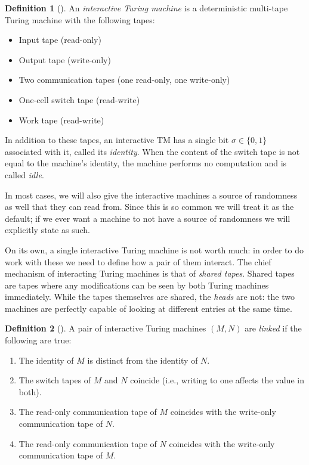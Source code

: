 \documentclass[english,12pt]{reedthesis}
\theoremstyle{plain}
\theoremstyle{definition}
\newtheorem{defn}[defn]{Definition}
\theoremstyle{remark}
\begin{document}
\begin{defn}[{\cite[Def.\ 4.2.1]{Go01}}]\label{def:interactive-tm}
  An \emph{interactive Turing machine} is a deterministic multi-tape Turing
  machine with the following tapes:
  \begin{itemize}
    \item Input tape (read-only)
    \item Output tape (write-only)
    \item Two communication tapes (one read-only, one write-only)
    \item One-cell switch tape (read-write)
    \item Work tape (read-write)
  \end{itemize}
  In addition to these tapes, an interactive TM has a single bit $\sigma \in \{0, 1\}$
  associated with it, called its \emph{identity}.
  When the content of the switch tape is not equal to the machine's identity,
  the machine performs no computation and is called \emph{idle}.

  In most cases, we will also give the interactive machines a source of
  randomness as well that they can read from. Since this is so common we will
  treat it as the default; if we ever want a machine to not have a source of
  randomness we will explicitly state as such.
\end{defn}

On its own, a single interactive Turing machine is not worth much: in order to
do work with these we need to define how a pair of them interact. The chief
mechanism of interacting Turing machines is that of \emph{shared
  tapes}. Shared tapes are tapes where any modifications can
be seen by both Turing machines immediately. While the tapes themselves are
shared, the \emph{heads} are not: the two machines are perfectly capable of
looking at different entries at the same time.

\begin{defn}[{\cite[Def.\ 4.2.2]{Go01}}]\label{def:linked-tms}
  A pair of interactive Turing machines $(M, N)$ are \emph{linked} if the
  following are true:
  \begin{enumerate}
    \item The identity of $M$ is distinct from the identity of $N$.
    \item The switch tapes of $M$ and $N$ coincide (i.e., writing to one affects
          the value in both).
    \item The read-only communication tape of $M$ coincides with the write-only
          communication tape of $N$.
    \item The read-only communication tape of $N$ coincides with the write-only
          communication tape of $M$.
  \end{enumerate}
\end{defn}
\end{document}
